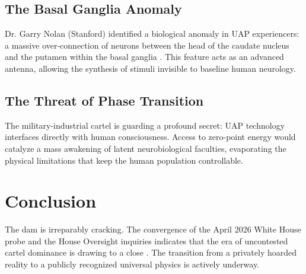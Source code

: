 \documentclass[11pt,a4paper]{article}
\begin{document}
\subsection{The Basal Ganglia Anomaly}\label{sec:basal-ganglia}
Dr. Garry Nolan (Stanford) identified a biological anomaly in UAP experiencers: a massive over-connection of neurons between the head of the caudate nucleus and the putamen within the basal ganglia \cite{CN-1}. This feature acts as an advanced antenna, allowing the synthesis of stimuli invisible to baseline human neurology.

\subsection{The Threat of Phase Transition}\label{sec:phase-transition}
The military-industrial cartel is guarding a profound secret: UAP technology interfaces directly with human consciousness. Access to zero-point energy would catalyze a mass awakening of latent neurobiological faculties, evaporating the physical limitations that keep the human population controllable.

\section{Conclusion}
\label{sec:conclusion}
The dam is irreparably cracking. The convergence of the April 2026 White House probe and the House Oversight inquiries indicates that the era of uncontested cartel dominance is drawing to a close \cite{LE-2, LE-3}. The transition from a privately hoarded reality to a publicly recognized universal physics is actively underway.

\printbibliography
\end{document}
